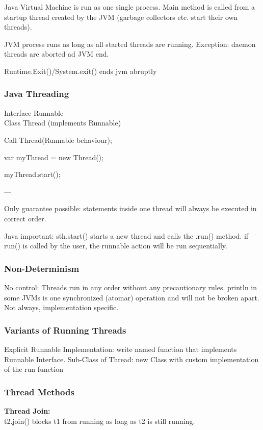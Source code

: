 Java Virtual Machine is run as one single process. Main method is called from a startup thread created by the JVM (garbage collectors etc. start their own threads).

JVM process runs as long as all started threads are running. Exception: daemon threads are aborted ad JVM end.

Runtime.Exit()/System.exit() ends jvm abruptly

\subsubsection{Java Threading}

Interface Runnable \\
Class Thread (implements Runnable)

Call Thread(Runnable behaviour);

var myThread = new Thread();

myThread.start();

---

Only guarantee possible: statements inside one thread will always be executed in correct order.

Java important: sth.start() starts a new thread and calls the .run() method. if run() is called by the user, the runnable action will be run sequentially.

\subsubsection{Non-Determinism}
No control: Threads run in any order without any precautionary rules. println in some JVMs is one synchronized (atomar) operation and will not be broken apart. Not always, implementation specific. 

\subsubsection{Variants of Running Threads}

Explicit Runnable Implementation: write named function that implements Runnable Interface.
Sub-Class of Thread: new Class with custom implementation of the run function

\subsubsection{Thread Methods}

\textbf{Thread Join:} \\
t2.join() blocks t1 from running as long as t2 is still running.

